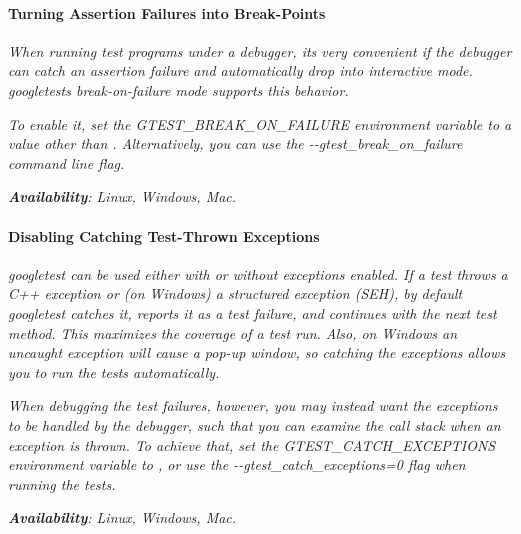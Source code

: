 {\itshape }

{\itshape \paragraph*{Turning Assertion Failures into Break-\/\+Points}}

{\itshape }

{\itshape When running test programs under a debugger, it\textquotesingle{}s very convenient if the debugger can catch an assertion failure and automatically drop into interactive mode. googletest\textquotesingle{}s {\itshape break-\/on-\/failure} mode supports this behavior.}

{\itshape To enable it, set the {\ttfamily G\+T\+E\+S\+T\+\_\+\+B\+R\+E\+A\+K\+\_\+\+O\+N\+\_\+\+F\+A\+I\+L\+U\+RE} environment variable to a value other than {} . Alternatively, you can use the {\ttfamily -\/-\/gtest\+\_\+break\+\_\+on\+\_\+failure} command line flag.}

{\itshape {\bfseries{Availability}}\+: Linux, Windows, Mac.}

{\itshape \paragraph*{Disabling Catching Test-\/\+Thrown Exceptions}}

{\itshape }

{\itshape googletest can be used either with or without exceptions enabled. If a test throws a C++ exception or (on Windows) a structured exception (S\+EH), by default googletest catches it, reports it as a test failure, and continues with the next test method. This maximizes the coverage of a test run. Also, on Windows an uncaught exception will cause a pop-\/up window, so catching the exceptions allows you to run the tests automatically.}

{\itshape When debugging the test failures, however, you may instead want the exceptions to be handled by the debugger, such that you can examine the call stack when an exception is thrown. To achieve that, set the {\ttfamily G\+T\+E\+S\+T\+\_\+\+C\+A\+T\+C\+H\+\_\+\+E\+X\+C\+E\+P\+T\+I\+O\+NS} environment variable to {}, or use the {\ttfamily -\/-\/gtest\+\_\+catch\+\_\+exceptions=0} flag when running the tests.}

{\itshape {\bfseries{Availability}}\+: Linux, Windows, Mac. }